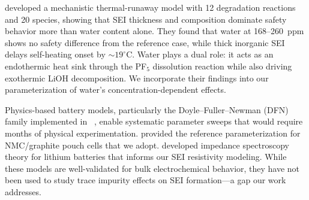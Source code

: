 \citet{baakes2023impact} developed a mechanistic thermal-runaway model with 12 degradation reactions and 20 species, showing that SEI thickness and composition dominate safety behavior more than water content alone. They found that water at 168--260~ppm shows no safety difference from the reference case, while thick inorganic SEI delays self-heating onset by ${\sim}19^\circ$C. Water plays a dual role: it acts as an endothermic heat sink through the PF$_5$ dissolution reaction while also driving exothermic LiOH decomposition. We incorporate their findings into our parameterization of water's concentration-dependent effects.

Physics-based battery models, particularly the Doyle--Fuller--Newman (DFN) family implemented in \pybamm~\citep{pybamm2020}, enable systematic parameter sweeps that would require months of physical experimentation. \citet{chen2020parameterization} provided the reference parameterization for NMC/graphite pouch cells that we adopt. \citet{single2021impedance} developed impedance spectroscopy theory for lithium batteries that informs our SEI resistivity modeling. While these models are well-validated for bulk electrochemical behavior, they have not been used to study trace impurity effects on SEI formation---a gap our work addresses.
